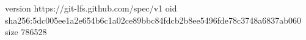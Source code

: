 version https://git-lfs.github.com/spec/v1
oid sha256:5dc005ee1a2e654b6c1a02ce89bbc84fdcb2b8ee5496fde78c3748a6837ab060
size 786528
